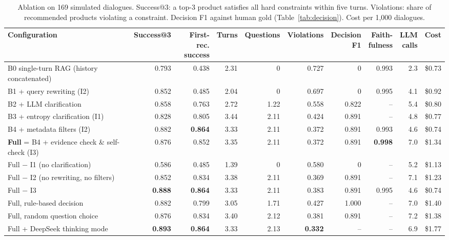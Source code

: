 \documentclass[10pt,a4paper,twocolumn]{article}
\begin{document}
\begin{table}[t]
\centering\small
\caption{Ablation on 169 simulated dialogues. Success@3: a top-3 product satisfies all hard constraints within five turns. Violations: share of recommended products violating a constraint. Decision F1 against human gold (Table~\ref{tab:decision}). Cost per 1,000 dialogues.}
\label{tab:ablation}
\begin{tabularx}{\textwidth}{@{}X rrrrrrrrr@{}}
\toprule
Configuration & Success@3 & \makecell[r]{First-rec.\\success} & Turns & Questions & Violations & \makecell[r]{Decision\\F1} & \makecell[r]{Faith-\\fulness} & \makecell[r]{LLM\\calls} & Cost\\
\midrule
B0 single-turn RAG (history concatenated) & 0.793 & 0.438 & 2.31 & 0 & 0.727 & 0 & 0.993 & 2.3 & \$0.73\\
B1 + query rewriting (I2) & 0.852 & 0.485 & 2.04 & 0 & 0.697 & 0 & 0.995 & 4.1 & \$0.92\\
B2 + LLM clarification & 0.858 & 0.763 & 2.72 & 1.22 & 0.558 & 0.822 & – & 5.4 & \$0.80\\
B3 + entropy clarification (I1) & 0.828 & 0.805 & 3.44 & 2.11 & 0.424 & 0.891 & – & 4.8 & \$0.77\\
B4 + metadata filters (I2) & 0.882 & \textbf{0.864} & 3.33 & 2.11 & 0.372 & 0.891 & 0.993 & 4.6 & \$0.74\\
\textbf{Full} = B4 + evidence check \& self-check (I3) & 0.876 & 0.852 & 3.35 & 2.11 & 0.372 & 0.891 & \textbf{0.998} & 7.0 & \$1.34\\
\midrule
Full − I1 (no clarification) & 0.586 & 0.485 & 1.39 & 0 & 0.580 & 0 & – & 5.2 & \$1.13\\
Full − I2 (no rewriting, no filters) & 0.852 & 0.834 & 3.38 & 2.11 & 0.369 & 0.891 & – & 7.1 & \$1.23\\
Full − I3 & \textbf{0.888} & \textbf{0.864} & 3.33 & 2.11 & 0.383 & 0.891 & 0.995 & 4.6 & \$0.74\\
\midrule
Full, rule-based decision & 0.882 & 0.799 & 3.05 & 1.71 & 0.427 & 1.000 & – & 7.0 & \$1.40\\
Full, random question choice & 0.876 & 0.834 & 3.40 & 2.12 & 0.381 & 0.891 & – & 7.2 & \$1.38\\
Full + DeepSeek thinking mode & \textbf{0.893} & \textbf{0.864} & 3.33 & 2.13 & \textbf{0.332} & – & – & 6.9 & \$1.77\\
\bottomrule
\end{tabularx}
\end{table}
\end{document}
